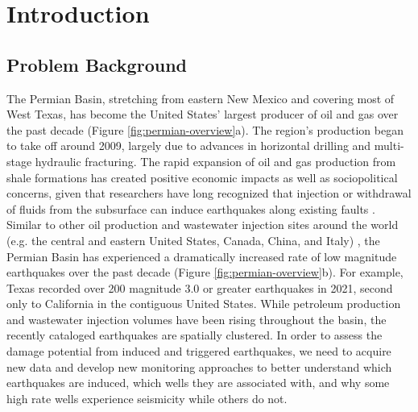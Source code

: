
\chapter{Introduction}


\section{Problem Background}
\label{sec:chap1-problem}



The Permian Basin, stretching from eastern New Mexico and covering most of West Texas, has become the United States' largest producer of oil and gas over the past decade (Figure \ref{fig:permian-overview}a). The region's production began to take off around 2009, largely due to advances in horizontal drilling and multi-stage hydraulic fracturing.
The rapid expansion of oil and gas production from shale formations has created positive economic impacts as well as sociopolitical concerns, given that researchers have long recognized that injection or withdrawal of fluids from the subsurface can induce earthquakes along existing faults \citep{Council2013InducedSeismicityPotential, Simpson1988TwoTypesReservoir, Ellsworth2013InjectionInducedEarthquakes}. Similar to other oil production and wastewater injection sites around the world (e.g. the central and eastern United States, Canada, China, and Italy) \citep{Foulger2018GlobalReviewHuman}, the Permian Basin has experienced a dramatically increased rate of low magnitude earthquakes over the past decade \citep{Frohlich2016HistoricalReviewInduced, Atkinson2016HydraulicFracturingSeismicity, Frohlich2019OnsetCauseIncreased, Lomax2019ImprovingAbsoluteEarthquake, Savvaidis2020InducedSeismicityDelaware, Skoumal2020InducedSeismicityDelaware} (Figure \ref{fig:permian-overview}b). For example, Texas recorded over 200 magnitude 3.0 or greater earthquakes in 2021, second only to California in the contiguous United States.  While petroleum production and wastewater injection volumes have been rising throughout the basin, the recently cataloged earthquakes are spatially clustered. In order to assess the damage potential from induced and triggered earthquakes, we need to acquire new data and develop new monitoring approaches to better understand which earthquakes are induced, which wells they are associated with, and why some high rate wells experience seismicity while others do not. 

